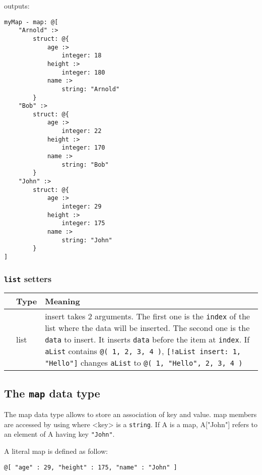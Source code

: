 \documentclass[11pt]{article}
\newcommand{\var}[1]{{\small\ttfamily #1}}
\newcommand{\cfunction}[1]{{\ttfamily #1}}
\begin{document}
outputs:

{\small
\begin{verbatim}
myMap - map: @[
    "Arnold" :>
        struct: @{
            age :>
                integer: 18
            height :>
                integer: 180
            name :>
                string: "Arnold"
        }
    "Bob" :>
        struct: @{
            age :>
                integer: 22
            height :>
                integer: 170
            name :>
                string: "Bob"
        }
    "John" :>
        struct: @{
            age :>
                integer: 29
            height :>
                integer: 175
            name :>
                string: "John"
        }
]
\end{verbatim}

\subsubsection{\lstinline{list} setters}

\begin{longtable}{>{\ttfamily}l|l|p{3.88in}}
{\bf getter}&{\bf Type}&{\bf Meaning}\\
\hline\endhead
 {insert}&
  {list}&
  {\cfunction{insert} takes 2 arguments. The first one is the \texttt{index} of the list where the data will be inserted. The second one is the \texttt{data} to insert. It inserts \texttt{data} before the item at \texttt{index}. If \texttt{aList} contains \texttt{@( 1, 2, 3, 4 )}, \texttt{[!aList insert: 1, "Hello"]} changes \texttt{aList} to  \texttt{@( 1, "Hello", 2, 3, 4 )}}\\
\end{longtable}

\subsection{The \lstinline{map} data type}

The map data type allows to store an association of key and value. map members are accessed by using \var{[<key>]} where \var{<key>} is a \lstinline{string}. If \var{A} is a map, \var{A["John"]} refers to an element of \var{A} having key \texttt{"John"}.

A literal map is defined as follow:

\begin{lstlisting}[language=goilTemplate]
@[ "age" : 29, "height" : 175, "name" : "John" ]
\end{lstlisting}

}
\end{document}
